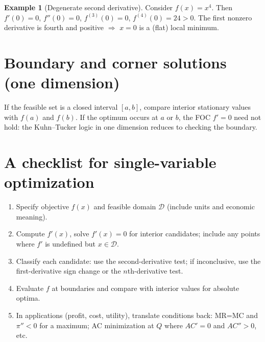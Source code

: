 \documentclass[12pt]{article}
\theoremstyle{definition}
\newtheorem{example}{Example}
\begin{document}
\begin{example}[Degenerate second derivative]
Consider $f(x)=x^4$. Then $f'(0)=0$, $f''(0)=0$, $f^{(3)}(0)=0$, $f^{(4)}(0)=24>0$. The first nonzero derivative is fourth and positive $\Rightarrow$ $x=0$ is a (flat) local minimum.
\end{example}

\section*{Boundary and corner solutions (one dimension)}
If the feasible set is a closed interval $[a,b]$, compare interior stationary values with $f(a)$ and $f(b)$. If the optimum occurs at $a$ or $b$, the FOC $f'=0$ need not hold: the Kuhn--Tucker logic in one dimension reduces to checking the boundary.

\section*{A checklist for single-variable optimization}
\begin{enumerate}[leftmargin=1.5em]
\item Specify objective $f(x)$ and feasible domain $\mathcal{D}$ (include units and economic meaning).
\item Compute $f'(x)$, solve $f'(x)=0$ for interior candidates; include any points where $f'$ is undefined but $x\in\mathcal{D}$.
\item Classify each candidate: use the second-derivative test; if inconclusive, use the first-derivative sign change or the $n$th-derivative test.
\item Evaluate $f$ at boundaries and compare with interior values for absolute optima.
\item In applications (profit, cost, utility), translate conditions back: MR=MC and $\pi''<0$ for a maximum; AC minimization at $Q$ where $AC'=0$ and $AC''>0$, etc.
\end{enumerate}

\newpage
\end{document}
